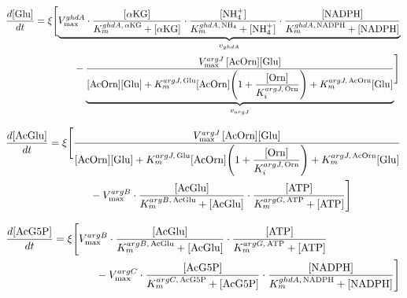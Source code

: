 %


\begin{align}
\frac{d[\mathrm{Glu}]}{dt}
  &= \xi \Biggl[
      \underbrace{
        V_{\max}^{ghdA}
        \cdot\frac{[\alpha\mathrm{KG}]}{K_m^{ghdA,\,\alpha\mathrm{KG}}+[\alpha\mathrm{KG}]}
        \cdot\frac{[\mathrm{NH}_4^+]}{K_m^{ghdA,\,\mathrm{NH}_4}+[\mathrm{NH}_4^+]}
        \cdot\frac{[\mathrm{NADPH}]}{K_m^{ghdA,\,\mathrm{NADPH}}+[\mathrm{NADPH}]}
      }_{v_{ghdA}}
  \notag\\
  &\qquad\qquad -
      \underbrace{
        \frac{V_{\max}^{argJ}\,[\mathrm{AcOrn}][\mathrm{Glu}]}
             {[\mathrm{AcOrn}][\mathrm{Glu}]
              +K_m^{argJ,\,\mathrm{Glu}}[\mathrm{AcOrn}]
               \!\left(1+\dfrac{[\mathrm{Orn}]}{K_i^{argJ,\,\mathrm{Orn}}}\right)
              +K_m^{argJ,\,\mathrm{AcOrn}}[\mathrm{Glu}]}
      }_{v_{argJ}}
    \Biggr]
\label{eq:dGlu}
\end{align}

\begin{align}
\frac{d[\mathrm{AcGlu}]}{dt}
  &= \xi \Biggl[
      \frac{V_{\max}^{argJ}\,[\mathrm{AcOrn}][\mathrm{Glu}]}
           {[\mathrm{AcOrn}][\mathrm{Glu}]
            +K_m^{argJ,\,\mathrm{Glu}}[\mathrm{AcOrn}]
             \!\left(1+\dfrac{[\mathrm{Orn}]}{K_i^{argJ,\,\mathrm{Orn}}}\right)
            +K_m^{argJ,\,\mathrm{AcOrn}}[\mathrm{Glu}]}
  \notag\\
  &\qquad\qquad -
      V_{\max}^{argB}
      \cdot\frac{[\mathrm{AcGlu}]}{K_m^{argB,\,\mathrm{AcGlu}}+[\mathrm{AcGlu}]}
      \cdot\frac{[\mathrm{ATP}]}{K_m^{argG,\,\mathrm{ATP}}+[\mathrm{ATP}]}
    \Biggr]
\label{eq:dAcGlu}
\end{align}

\begin{align}
\frac{d[\mathrm{AcG5P}]}{dt}
  &= \xi \Biggl[
      V_{\max}^{argB}
      \cdot\frac{[\mathrm{AcGlu}]}{K_m^{argB,\,\mathrm{AcGlu}}+[\mathrm{AcGlu}]}
      \cdot\frac{[\mathrm{ATP}]}{K_m^{argG,\,\mathrm{ATP}}+[\mathrm{ATP}]}
  \notag\\
  &\qquad\qquad -
      V_{\max}^{argC}
      \cdot\frac{[\mathrm{AcG5P}]}{K_m^{argC,\,\mathrm{AcG5P}}+[\mathrm{AcG5P}]}
      \cdot\frac{[\mathrm{NADPH}]}{K_m^{ghdA,\,\mathrm{NADPH}}+[\mathrm{NADPH}]}
    \Biggr]
\label{eq:dAcG5P}
\end{align}

